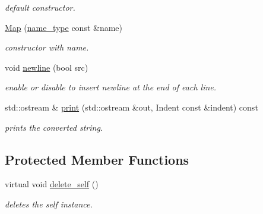 \begin{DoxyCompactItemize}
\begin{DoxyCompactList}\small\item\em default constructor. \end{DoxyCompactList}\item 
\hyperlink{classhryky_1_1log_1_1format_1_1_map_a00ea6bbe8159a4095e9499ee5da15457}{Map} (\hyperlink{namespacehryky_1_1log_1_1format_ab7408d1e2ed2d648dbf9bba69eb74288}{name\-\_\-type} const \&name)
\begin{DoxyCompactList}\small\item\em constructor with name. \end{DoxyCompactList}\item 
void \hyperlink{classhryky_1_1log_1_1format_1_1_map_a857d1ea2c99c677528658451b4e5518f}{newline} (bool src)
\begin{DoxyCompactList}\small\item\em enable or disable to insert newline at the end of each line. \end{DoxyCompactList}\item 
\hypertarget{classhryky_1_1log_1_1format_1_1_base_a9036ce4ca367b322c9f41365ee249cb1}{std\-::ostream \& \hyperlink{classhryky_1_1log_1_1format_1_1_base_a9036ce4ca367b322c9f41365ee249cb1}{print} (std\-::ostream \&out, Indent const \&indent) const }\label{classhryky_1_1log_1_1format_1_1_base_a9036ce4ca367b322c9f41365ee249cb1}

\begin{DoxyCompactList}\small\item\em prints the converted string. \end{DoxyCompactList}\end{DoxyCompactItemize}
\subsection*{Protected Member Functions}
\begin{DoxyCompactItemize}
\item 
virtual void \hyperlink{classhryky_1_1log_1_1format_1_1_base_af1f3f2984f1a130ca7fd927c62d73ac0}{delete\-\_\-self} ()
\begin{DoxyCompactList}\small\item\em deletes the self instance. \end{DoxyCompactList}\end{DoxyCompactItemize}

